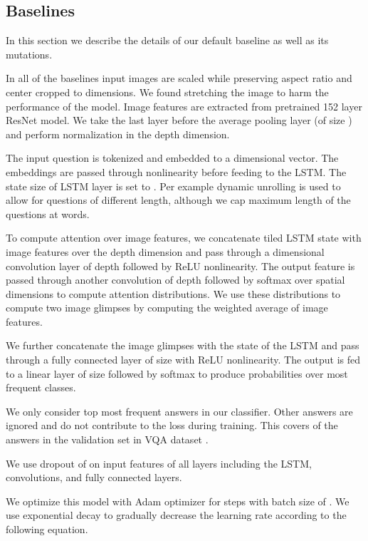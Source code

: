 \documentclass[10pt,twocolumn,letterpaper]{article}
\begin{document}
\subsection{Baselines}
In this section we describe the details of our default baseline as well as its mutations.

In all of the baselines input images are scaled while preserving aspect ratio and center cropped to  dimensions. We found stretching the image to harm the performance of the model. Image features are extracted from pretrained 152 layer ResNet \cite{He2016DeepRL} model. We take the last layer before the average pooling layer (of size ) and perform  normalization in the depth dimension. 

The input question is tokenized and embedded to a  dimensional vector. The embeddings are passed through  nonlinearity before feeding to the LSTM. The state size of LSTM layer is set to . Per example dynamic unrolling is used to allow for questions of different length, although we cap maximum length of the questions at  words.

To compute attention over image features, we concatenate tiled LSTM state with image features over the depth dimension and pass through a  dimensional convolution layer of depth  followed by ReLU \cite{Nair2010RectifiedLU} nonlinearity. The output feature is passed through another  convolution of depth  followed by softmax over spatial dimensions to compute attention distributions. We use these distributions to compute two image glimpses by computing the weighted average of image features.

We further concatenate the image glimpses with the state of the LSTM and pass through a fully connected layer of size  with ReLU nonlinearity. The output is fed to a linear layer of size  followed by softmax to produce probabilities over most frequent classes.

We only consider top  most frequent answers in our classifier. Other answers are ignored and do not contribute to the loss during training. This covers  of the answers in the validation set in VQA dataset \cite{Antol2015VQAVQ}.

We use dropout of  on input features of all layers including the LSTM, convolutions, and fully connected layers.

We optimize this model with Adam optimizer \cite{Kingma2014AdamAM} for  steps with batch size of . We use exponential decay to gradually decrease the learning rate according to the following equation.
\end{document}
